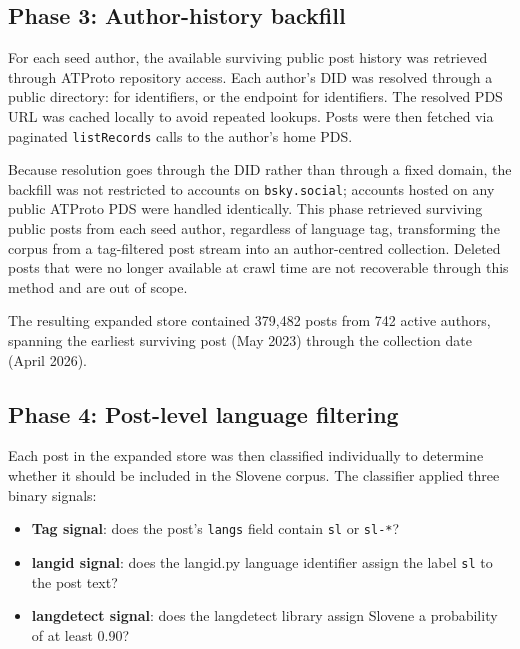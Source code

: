 \subsection{Phase 3: Author-history backfill}

For each seed author, the available surviving public post history was retrieved through ATProto repository access. Each author's DID was resolved through a public directory:  for  identifiers, or the  endpoint for  identifiers. The resolved PDS URL was cached locally to avoid repeated lookups. Posts were then fetched via paginated \texttt{listRecords} calls to the author's home PDS.

Because resolution goes through the DID rather than through a fixed domain, the backfill was not restricted to accounts on \texttt{bsky.social}; accounts hosted on any public ATProto PDS were handled identically. This phase retrieved surviving public posts from each seed author, regardless of language tag, transforming the corpus from a tag-filtered post stream into an author-centred collection. Deleted posts that were no longer available at crawl time are not recoverable through this method and are out of scope.

The resulting expanded store contained 379,482 posts from 742 active authors, spanning the earliest surviving post (May 2023) through the collection date (April 2026).

\subsection{Phase 4: Post-level language filtering}

Each post in the expanded store was then classified individually to determine whether it should be included in the Slovene corpus. The classifier applied three binary signals:

\begin{itemize}
  \renewcommand\labelitemi{\textendash} %
  \item \textbf{Tag signal}: does the post's \texttt{langs} field contain \texttt{sl} or \texttt{sl-*}?
  \item \textbf{langid signal}: does the langid.py language identifier \parencite{lui2012langid} assign the label \texttt{sl} to the post text?
  \item \textbf{langdetect signal}: does the langdetect library \parencite{nakatani2010langdetect} assign Slovene a probability of at least 0.90?
\end{itemize}

